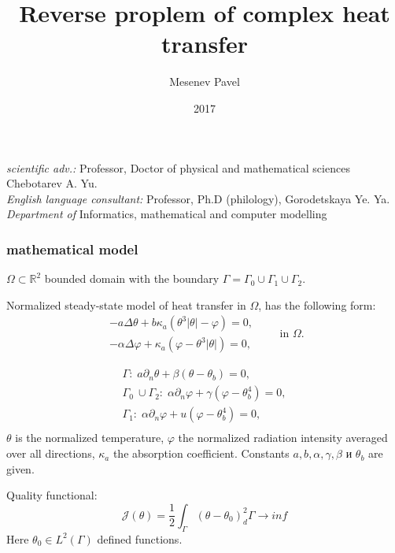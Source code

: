 \documentclass[9pt]{beamer}
\begin{document}
    \title{Reverse proplem of complex heat transfer}
    \author{Mesenev Pavel}

    \date{2017}
\begin{frame}
    \titlepage
    \begin{minipage}{1\textwidth} %
    \begin{flushleft} %
    \emph{scientific adv.:} Professor, Doctor of physical and mathematical sciences Chebotarev A. Yu.\\
    \emph{English language consultant:} Professor, Ph.D (philology), Gorodetskaya Ye. Ya.
    \emph{Department of} Informatics, mathematical and computer modelling\\
    \end{flushleft} %
    \end{minipage} %
\end{frame}

\begin{frame}
\frametitle{mathematical model}

$\Omega \subset \mathbb{R}^2$ bounded domain with the boundary $\Gamma = \Gamma_0 \cup \Gamma_1 \cup \Gamma_2$.

Normalized steady-state model of heat transfer in  $\Omega$, has the following form:
\begin{equation}
    \label{initial}
    \begin{aligned}
                - a \Delta \theta + b \kappa_a(\theta ^ 3 | \theta | - \varphi) = 0,  \\
                - \alpha \Delta \varphi + \kappa_a (\varphi - \theta ^3 | \theta |) = 0,
    \end{aligned}
    \qquad \text{in } \Omega.
\end{equation}

\begin{equation}
    \label{initial-boundary}
    \begin{aligned}
        \Gamma: \; a \partial_n \theta + \beta (\theta - \theta _b) = 0, \\
        \Gamma_0 \ \cup \Gamma_2: \; \alpha \partial_n \varphi + \gamma(\varphi - \theta_b ^4 ) = 0, \\
        \Gamma_1: \; \alpha \partial_n \varphi + u(\varphi - \theta_b ^4 ) = 0, \\
    \end{aligned}
\end{equation}
$\theta$ is the normalized temperature, $\varphi$ the normalized radiation intensity averaged over all directions,  $\kappa_a$ the absorption coefficient. Constants $a, b, \alpha, \gamma, \beta$ и $\theta_b$ are given.

    Quality functional:
    \begin{equation}
    	\label{quality}
    	\mathcal{J}(\theta) = \frac{1}{2} \int_\Gamma (\theta - \theta_0)^2_d\Gamma \rightarrow inf
    \end{equation}
    Here $ \theta_0  \in L^2(\Gamma)$ defined functions.
\end{frame}
\end{document}
